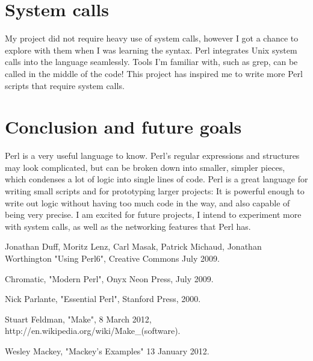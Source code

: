 \documentclass[a4paper, 12pt]{article}
\begin{document}
\section{System calls}

My project did not require heavy use of system calls, however I got a chance to explore with them when I was learning the syntax. Perl integrates Unix system calls into the language seamlessly. Tools I'm familiar with, such as grep, can be called in the middle of the code! This project has inspired me to write more Perl scripts that require system calls.


\section{Conclusion and future goals}
Perl is a very useful language to know. Perl's regular expressions and structures may look complicated, but can be broken down into smaller, simpler pieces, which condenses a lot of logic into single lines of code. Perl is a great language for writing small scripts and for prototyping larger projects: It is powerful enough to write out logic without having too much code in the way, and also capable of being very precise. I am excited for future projects, I intend to experiment more with system calls, as well as the networking features that Perl has.  

\begin{thebibliography}{1}

	 Jonathan Duff, Moritz Lenz, Carl Masak, Patrick Michaud, Jonathan Worthington "Using Perl6", Creative Commons July 2009. 

         Chromatic, "Modern Perl", Onyx Neon Press, July 2009.

         Nick Parlante, "Essential Perl", Stanford Press, 2000.

         Stuart Feldman, "Make", 8 March 2012, http://en.wikipedia.org/wiki/Make\_(software).    

         Wesley Mackey, "Mackey's Examples" 13 January 2012.

        

\end{thebibliography}
\end{document}
